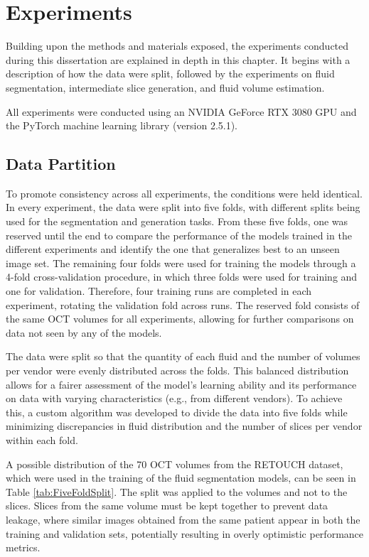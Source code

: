 \chapter{Experiments}\label{Experiments}
Building upon the methods and materials exposed, the experiments conducted during this dissertation are explained in depth in this chapter. It begins with a description of how the data were split, followed by the experiments on fluid segmentation, intermediate slice generation, and fluid volume estimation.
\par
All experiments were conducted using an NVIDIA GeForce RTX 3080 GPU and the \hbox{PyTorch} machine learning library (version 2.5.1).

\section{Data Partition}\label{CrossValidation}
To promote consistency across all experiments, the conditions were held identical. In every experiment, the data were split into five folds, with different splits being used for the segmentation and generation tasks. From these five folds, one was reserved until the end to compare the performance of the models trained in the different experiments and identify the one that generalizes best to an unseen image set. The remaining four folds were used for training the models through a 4-fold cross-validation procedure, in which three folds were used for training and one for validation. Therefore, four training runs are completed in each experiment, rotating the validation fold across runs. The reserved fold consists of the same OCT volumes for all experiments, allowing for further comparisons on data not seen by any of the models.
\par
The data were split so that the quantity of each fluid and the number of volumes per vendor were evenly distributed across the folds. This balanced distribution allows for a fairer assessment of the model's learning ability and its performance on data with varying characteristics (e.g., from different vendors). To achieve this, a custom algorithm was developed to divide the data into five folds while minimizing discrepancies in fluid distribution and the number of slices per vendor within each fold.
\par
A possible distribution of the 70 OCT volumes from the RETOUCH dataset, which were used in the training of the fluid segmentation models, can be seen in Table \ref{tab:FiveFoldSplit}. The split was applied to the volumes and not to the slices. Slices from the same volume must be kept together to prevent data leakage, where similar images obtained from the same patient appear in both the training and validation sets, potentially resulting in overly optimistic performance metrics.

